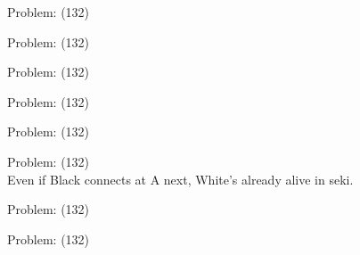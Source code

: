 \documentclass[11pt]{article}
\begin{document}
\begin{minipage}[t]{0.5\textwidth}
  {\centering
  
Problem: (132)\\
  }
\end{minipage}
\begin{minipage}[t]{0.5\textwidth}
  {\centering
  
Problem: (132)\\
  }
\end{minipage}
\begin{minipage}[t]{0.5\textwidth}
  {\centering
  
Problem: (132)\\
  }
\end{minipage}
\begin{minipage}[t]{0.5\textwidth}
  {\centering
  
Problem: (132)\\
  }
\end{minipage}
\begin{minipage}[t]{0.5\textwidth}
  {\centering
  
Problem: (132)\\
  }
\end{minipage}
\begin{minipage}[t]{0.5\textwidth}
  {\centering
  
Problem: (132)\\
Even if Black connects at A next, White's already alive in seki.\\
  }
\end{minipage}
\begin{minipage}[t]{0.5\textwidth}
  {\centering
  
Problem: (132)\\
  }
\end{minipage}
\begin{minipage}[t]{0.5\textwidth}
  {\centering
  
Problem: (132)\\
  }
\end{minipage}
\end{document}
